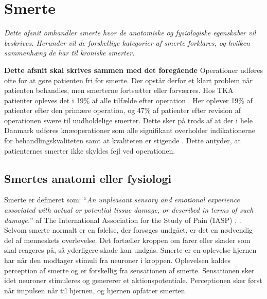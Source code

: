 \section{Smerte}
\textit{Dette afsnit omhandler smerte hvor de anatomiske og fysiologiske egenskaber vil beskrives. Herunder vil de forskellige kategorier af smerte forklares, og hvilken sammenhæng de har til kroniske smerter.}


\textbf{Dette afsnit skal skrives sammen med det foregående}
Operationer udføres ofte for at gøre patienten fri for smerte. Der opstår derfor et klart problem når patienten behandles, men smerterne fortsætter eller forværres. Hos TKA patienter opleves det i 19\% af alle tilfælde efter operation \citep{Petersen2015}. Her oplever 19\% af patienter efter den primære operation, og 47\% af patienter efter revision af operationen svære til uudholdelige smerter. Dette sker på trods af at der i hele Danmark udføres knæoperationer som alle signifikant overholder indikationerne for behandlingskvaliteten samt at kvaliteten er stigende \citep{aarsrapport2016}. Dette antyder, at patienternes smerter ikke skyldes fejl ved operationen.


\subsection{Smertes anatomi eller fysiologi}
Smerte er defineret som: “\textit{An unpleasant sensory and emotional experience associated with actual or potential tissue damage, or described in terms of such damage.}” af The International Association for the Study of Pain (IASP) \citep{Giangregorio1997}, \citep{Carmon}.\\
Selvom smerte normalt er en følelse, der forsøges undgået, er det en nødvendig del af menneskets overlevelse. Det fortæller kroppen om farer eller skader som skal reageres på, så yderligere skade kan undgås.
Smerte er en oplevelse hjernen har når den modtager stimuli fra neuroner i kroppen. Oplevelsen kaldes perception af smerte og er forskellig fra sensationen af smerte. Sensationen sker idet neuroner stimuleres og genererer et aktionspotentiale. Perceptionen sker først når impulsen når til hjernen, og hjernen opfatter smerten. 


